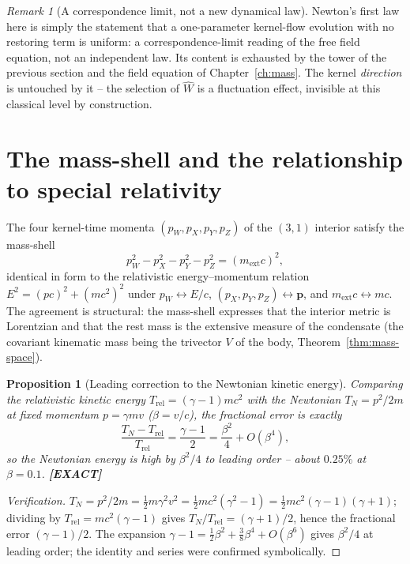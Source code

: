 \documentclass[11pt,oneside]{book}
\newcommand{\Wh}{\hat{W}}                         %
\newcommand{\status}[1]{{\sffamily\bfseries\color{statuscol}[#1]}}
\theoremstyle{plain}
\newtheorem{proposition}[theorem]{Proposition}
\theoremstyle{definition}
\theoremstyle{remark}
\newtheorem{remark}[theorem]{Remark}
\begin{document}
\begin{remark}[A correspondence limit, not a new dynamical law]
Newton's first law here is simply the statement that a one-parameter kernel-flow
evolution with no restoring term is uniform: a correspondence-limit reading of the
free field equation, not an independent law. Its content is exhausted by the tower of
the previous section and the field equation of Chapter~\ref{ch:mass}. The kernel
\emph{direction} is untouched by it -- the selection of $\Wh$ is a fluctuation effect,
invisible at this classical level by construction.
\end{remark}

\section{The mass-shell and the relationship to special relativity}
\label{sec:massshell-sr}

The four kernel-time momenta $(p_W,p_X,p_Y,p_Z)$ of the $(3,1)$ interior satisfy the
mass-shell
\[
  p_W^2-p_X^2-p_Y^2-p_Z^2=(m_{\mathrm{ext}}c)^2,
\]
identical in form to the relativistic energy--momentum relation
$E^2=(pc)^2+(mc^2)^2$ under $p_W\leftrightarrow E/c$,
$(p_X,p_Y,p_Z)\leftrightarrow\mathbf p$, and $m_{\mathrm{ext}}c\leftrightarrow mc$. The
agreement is structural: the mass-shell expresses that the interior metric is
Lorentzian and that the rest mass is the extensive measure of the condensate (the
covariant kinematic mass being the trivector $V$ of the body,
Theorem~\ref{thm:mass-space}).

\begin{proposition}[Leading correction to the Newtonian kinetic energy]
\label{prop:sr-correction}
Comparing the relativistic kinetic energy $T_{\mathrm{rel}}=(\gamma-1)mc^2$ with the
Newtonian $T_N=p^2/2m$ at fixed momentum $p=\gamma mv$ ($\beta=v/c$), the fractional
error is exactly
\[
  \frac{T_N-T_{\mathrm{rel}}}{T_{\mathrm{rel}}}=\frac{\gamma-1}{2}
   =\frac{\beta^2}{4}+O(\beta^4),
\]
so the Newtonian energy is high by $\beta^2/4$ to leading order -- about $0.25\%$ at
$\beta=0.1$. \status{EXACT}
\end{proposition}

\begin{proof}[Verification]
$T_N=p^2/2m=\tfrac12 m\gamma^2v^2=\tfrac12 mc^2(\gamma^2-1)
=\tfrac12 mc^2(\gamma-1)(\gamma+1)$; dividing by $T_{\mathrm{rel}}=mc^2(\gamma-1)$
gives $T_N/T_{\mathrm{rel}}=(\gamma+1)/2$, hence the fractional error $(\gamma-1)/2$.
The expansion $\gamma-1=\tfrac12\beta^2+\tfrac38\beta^4+O(\beta^6)$ gives $\beta^2/4$
at leading order; the identity and series were confirmed symbolically.
\end{proof}
\end{document}
